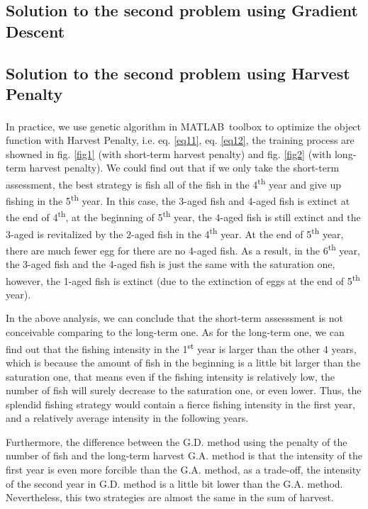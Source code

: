 \documentclass{IEEEtran}
\begin{document}
\subsection{Solution to the second problem using Gradient Descent}
\subsection{Solution to the second problem using Harvest Penalty}

In practice, we use genetic algorithm in MATLAB\textsuperscript\textregistered \ toolbox to optimize the object function with Harvest Penalty, i.e. eq. \ref{eq11}, eq. \ref{eq12}, the training process are showned in fig. \ref{fig1} (with short-term harvest penalty) and fig. \ref{fig2} (with long-term harvest penalty). We could find out that if we only take the short-term assessment, the best strategy is fish all of the fish in the 4\textsuperscript{th} year and give up fishing in the 5\textsuperscript{th} year. In this case, the 3-aged fish and 4-aged fish is extinct at the end of 4\textsuperscript{th}, at the beginning of 5\textsuperscript{th} year, the 4-aged fish is still extinct and the 3-aged is revitalized by the 2-aged fish in the 4\textsuperscript{th} year. At the end of 5\textsuperscript{th} year, there are much fewer egg for there are no 4-aged fish. As a result, in the 6\textsuperscript{th} year, the 3-aged fish and the 4-aged fish is just the same with the saturation one, however, the 1-aged fish is extinct (due to the extinction of eggs at the end of 5\textsuperscript{th} year). 

In the above analysis, we can conclude that the short-term assesssment is not conceivable comparing to the long-term one. As for the long-term one, we can find out that the fishing intensity in the 1\textsuperscript{st} year is larger than the other 4 years, which is because the amount of fish in the beginning is a little bit larger than the saturation one, that means even if the fishing intensity is relatively low, the number of fish will surely decrease to the saturation one, or even lower. Thus, the splendid fishing strategy would contain a fierce fishing intensity in the first year, and a relatively average intensity in the following years. 

Furthermore, the difference between the G.D. method using the penalty of the number of fish and the long-term harvest G.A. method is that the intensity of the first year is even more forcible than the G.A. method, as a trade-off, the intensity of the second year in G.D. method is a little bit lower than the G.A. method. Nevertheless, this two strategies are almost the same in the sum of harvest. 
\end{document}
